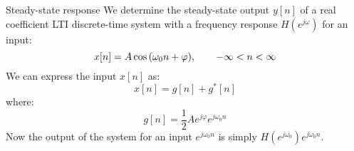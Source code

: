\documentclass[../../main/main.tex]{subfiles}
\begin{document}
\begin{example}{Steady-state response}{}
    We determine the steady-state output \( y[n] \) of a real coefficient LTI discrete-time system with a frequency response \( H(e^{j\omega}) \) for an input:
    \begin{equation}
        x[n]
        =
        A \cos\qty(\omega_{0}n + \varphi),
        \qquad
        -\infty < n < \infty
        \label{eq:L09_S43_1}
    \end{equation}
    We can express the input \( x[n] \) as:
    \begin{equation}
        x[n]
        =
        g[n] + g^*[n]
        \label{eq:L09_S44_1}
    \end{equation}
    where:
    \begin{equation}
        g[n]
        =
        \frac{1}{2} A e^{j \varphi} e^{j \omega_{0}n}
        \label{eq:L09_S44_2}
    \end{equation}
    Now the output of the system for an input \( e^{j \omega_{0}n} \) is simply \( H(e^{j\omega_{0}}) e^{j\omega_{0}n} \).


\end{example}
\end{document}

